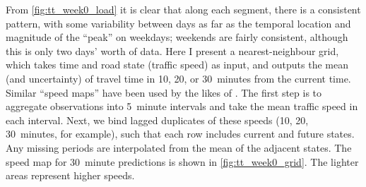 From \cref{fig:tt_week0_load} it is clear that along each segment, there is a consistent pattern, with some variability between days as far as the temporal location and magnitude of the ``peak'' on weekdays; weekends are fairly consistent, although this is only two days' worth of data. Here I present a nearest-neighbour grid, which takes time and road state (traffic speed) as input, and outputs the mean (and uncertainty) of travel time in 10, 20, or 30~minutes from the current time. Similar ``speed maps'' have been used by the likes of \citet{Cathey_2003, Celan_2017, Chen_2014}. The first step is to aggregate observations into 5~minute intervals and take the mean traffic speed in each interval. Next, we bind lagged duplicates of these speeds (10, 20, 30~minutes, for example), such that each row includes current and future states. Any missing periods are interpolated from the mean of the adjacent states. The speed map for 30~minute predictions is shown in \cref{fig:tt_week0_grid}. The lighter areas represent higher speeds.







